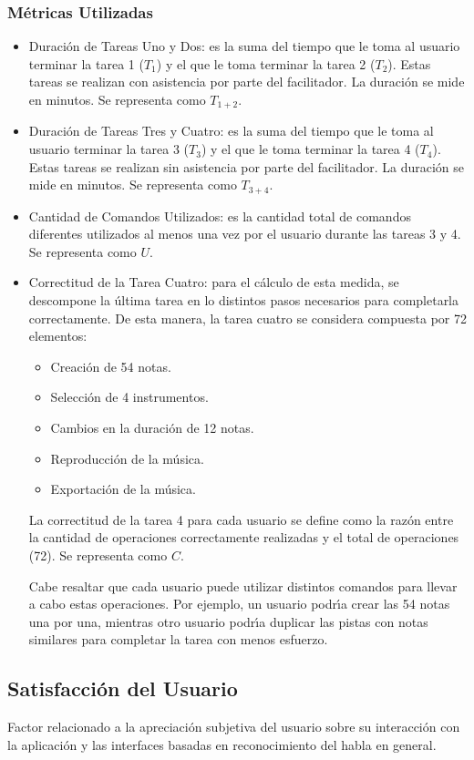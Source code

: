 \subsubsection{M\'etricas Utilizadas}
\begin{itemize}
	\item Duraci\'on de Tareas Uno y Dos: es la suma del tiempo que le toma al usuario
	terminar la tarea 1 ($T_1$) y el que le toma terminar la tarea 2 ($T_2$). 
	Estas tareas se realizan con asistencia por parte del facilitador. 
	La duraci\'on se mide en minutos. Se representa como $T_{1+2}$.
	\item Duraci\'on de Tareas Tres y Cuatro: es la suma del tiempo que le toma al usuario
	terminar la tarea 3 ($T_3$) y el que le toma terminar la tarea 4 ($T_4$). 
	Estas tareas se realizan sin asistencia por parte del facilitador. 
	La duraci\'on se mide en minutos. Se representa como $T_{3+4}$.
	\item Cantidad de Comandos Utilizados: es la cantidad total de comandos diferentes utilizados
	al menos una vez por el usuario durante las tareas 3 y 4. Se representa como $U$.
	\item Correctitud de la Tarea Cuatro: para el c\'alculo de esta medida, se descompone la
	\'ultima tarea en lo distintos pasos necesarios para completarla correctamente.
	De esta manera, la tarea cuatro se considera compuesta por 72 elementos:
	\begin{itemize}
		\item Creaci\'on de 54 notas.
		\item Selecci\'on de 4 instrumentos.
		\item Cambios en la duraci\'on de 12 notas.
		\item Reproducci\'on de la m\'usica.
		\item Exportaci\'on de la m\'usica.
	\end{itemize}
	La correctitud de la tarea 4 para cada usuario se define como la raz\'on entre la cantidad de operaciones
	correctamente realizadas y el total de operaciones (72). Se representa como $C$.

	Cabe resaltar que cada usuario puede utilizar distintos comandos para llevar a cabo estas operaciones.
	Por ejemplo, un usuario podr{\'\i}a crear las 54 notas una por una, mientras otro usuario podr{\'\i}a
	duplicar las pistas con notas similares para completar la tarea con menos esfuerzo.

\end{itemize}

\subsection{Satisfacci\'on del Usuario}
Factor relacionado a la apreciaci\'on subjetiva del usuario sobre su interacci\'on con la aplicaci\'on y
las interfaces basadas en reconocimiento del habla en general.
